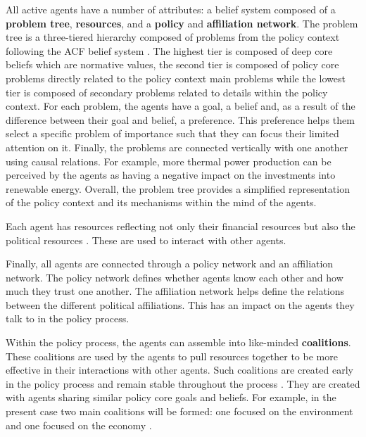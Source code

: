 All active agents have a number of attributes: a belief system composed of a {\bfseries problem tree}, {\bfseries resources}, and a {\bfseries policy} and {\bfseries affiliation network}. The problem tree is a three-tiered hierarchy composed of problems from the policy context following the ACF belief system \citep{sabatier1987knowledge}. The highest tier is composed of deep core beliefs which are normative values, the second tier is composed of policy core problems directly related to the policy context main problems while the lowest tier is composed of secondary problems related to details within the policy context. For each problem, the agents have a goal, a belief and, as a result of the difference between their goal and belief, a preference. This preference helps them select a specific problem of importance such that they can focus their limited attention on it. Finally, the problems are connected vertically with one another using causal relations. For example, more thermal power production can be perceived by the agents as having a negative impact on the investments into renewable energy. Overall, the problem tree provides a simplified representation of the policy context and its mechanisms within the mind of the agents.

Each agent has resources reflecting not only their financial resources but also the political resources \citep{nohrstedt2010logic}. These are used to interact with other agents.

Finally, all agents are connected through a policy network and an affiliation network. The policy network defines whether agents know each other and how much they trust one another. The affiliation network helps define the relations between the different political affiliations. This has an impact on the agents they talk to in the policy process.

Within the policy process, the agents can assemble into like-minded {\bfseries coalitions}. These coalitions are used by the agents to pull resources together to be more effective in their interactions with other agents. Such coalitions are created early in the policy process and remain stable throughout the process \citep{weible2018advocacy}. They are created with agents sharing similar policy core goals and beliefs. For example, in the present case two main coalitions will be formed: one focused on the environment and one focused on the economy \citep{markard2016socio}.


